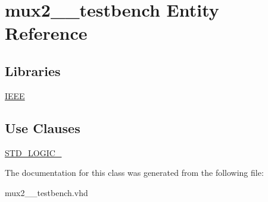 \hypertarget{classmux2__1__testbench}{}\section{mux2\+\_\+\_\+testbench Entity Reference}
\label{classmux2__1__testbench}
\subsection*{Libraries}
 \begin{DoxyCompactItemize}
\item 
\mbox{\label{classmux2__1__testbench_a3bf77f3bdd1b8a39e02ae87c77bc3efd}} 
\hyperlink{classmux2__1__testbench_a3bf77f3bdd1b8a39e02ae87c77bc3efd}{I\+E\+EE} 
\end{DoxyCompactItemize}
\subsection*{Use Clauses}
 \begin{DoxyCompactItemize}
\item 
\mbox{\label{classmux2__1__testbench_a4564bed8d60157e343839db79d9bb5a9}} 
\hyperlink{classmux2__1__testbench_a4564bed8d60157e343839db79d9bb5a9}{S\+T\+D\+\_\+\+L\+O\+G\+I\+C\+\_}   
\end{DoxyCompactItemize}


The documentation for this class was generated from the following file\+:\begin{DoxyCompactItemize}
\item 
mux2\+\_\+\_\+testbench.\+vhd\end{DoxyCompactItemize}
